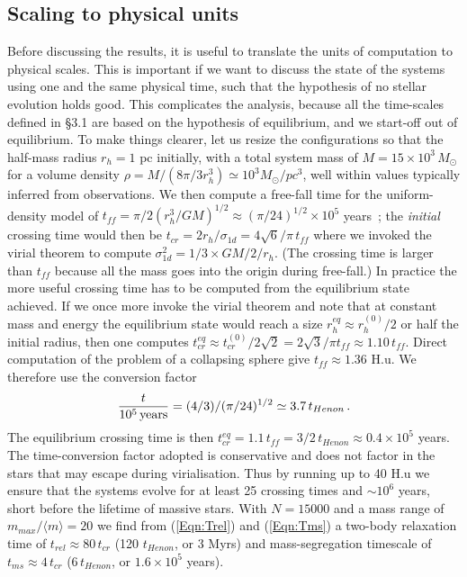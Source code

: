 \subsection{Scaling to physical units}
Before discussing the results, it is useful to translate the units of computation to physical scales. This is important if we want to discuss the state of the systems using one and the same physical time, such that the hypothesis of no stellar evolution holds good.
This complicates the analysis, because  all the time-scales defined in \S 3.1 are based on the hypothesis of equilibrium, and we start-off out of equilibrium. To make things clearer, let us resize the configurations so that the half-mass radius $r_h = 1$ pc initially, with a total system mass of $M = 15\times 10^3\, M_\odot$ for a volume density $\rho = M / (8\pi/3 r_h^3) \simeq 10^3 M_\odot / pc^3$, well within values typically inferred from observations. 
We then compute a free-fall time for the uniform-density model of $t_{ff} = \pi /2 \left( r_h^3 / GM \right)^{1/2} \approx (\pi/24)^{1/2} \times 10^5 $ years~; the {\it initial} crossing time would then be $t_{cr} = 2 r_h / \sigma_{1d} = 4\sqrt{6}/\pi \,t_{ff} $ where we invoked the virial theorem to compute $\sigma^2_{1d} = 1/3 \times GM/2 / r_h $. (The crossing time is larger than $t_{ff}$ because all the mass goes into the origin during free-fall.)  
In practice the more useful crossing time has to be computed from the equilibrium state achieved. If we once more invoke the virial theorem and note that at constant mass and energy the equilibrium state would reach a size $r_h^{eq} \approx r_h^{(0)}/2$ or half the initial radius, then one computes $t_{cr}^{eq} \approx t_{cr}^{(0)} / 2\sqrt{2} =  2\sqrt{3}/\pi t_{ff} \approx 1.10 \, t_{ff}$. 
Direct computation of the problem of a collapsing sphere give $t_{ff} \approx 1.36$ H.u. We therefore use the conversion factor \[ \frac{t}{{10^5\,{\rm years}}} = (4/3) / (\pi/24)^{1/2} \simeq  3.7\, t_{Henon} \,. \]  The equilibrium crossing time is then $t_{cr}^{eq} = 1.1\, t_{ff} = 3/2 \, t_{Henon} \approx 0.4 \times 10^5 $ years. The time-conversion factor adopted is conservative and does not factor in the stars that may escape during virialisation.%
Thus by running up to 40 H.u we ensure that the systems evolve for at least 25 crossing times and $ \sim 10^6 $ years, short before the lifetime of massive stars.  With $N = 15 000$ and a mass range of $m_{max}/\langle m\rangle = 20$ we find from (\ref{Eqn:Trel}) and (\ref{Eqn:Tms}) a two-body relaxation time of $t_{rel} \approx 80\,t_{cr} $ (120 $t_{Henon}$, or 3 Myrs) and mass-segregation timescale of $t_{ms} \approx 4\, t_{cr} $ ($6\, t_{Henon}$, or $1.6\times 10^5$ years).  
  
